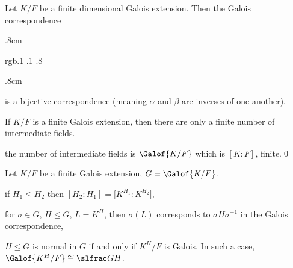 \bthrm[title=The Fundamental Theorem of Galois Theory, name=ftogt]

    Let $K/F$ be a finite dimensional Galois extension.
    Then the Galois correspondence

    \kern.8cm
    \centerline{\color rgb{.1 .1 .8}}
    \kern.8cm

    is a bijective correspondence (meaning $\alpha$ and $\beta$ are inverses of one another).

\ethrm

\bcoro

    If $K/F$ is a finite Galois extension, then there are only a finite number of intermediate fields.

\ecoro

\Proof the number of intermediate fields is $\Galof{K/F}$ which is $[K:F]$, finite.\qed

\bcoro[name=galoisproperties]

    Let $K/F$ be a finite Galois extension, $G=\Galof{K/F}$.
    \benum
        \item if $H_1\leq H_2$ then $[H_2:H_1]=\bigl[K^{H_1}:K^{H_2}\bigr]$,
        \item for $\sigma\in G$, $H\leq G$, $L=K^H$, then $\sigma(L)$ corresponds to $\sigma H\sigma^{-1}$ in the Galois correspondence,
        \item $H\leq G$ is normal in $G$ if and only if $K^H/F$ is Galois.
        In such a case, $\Galof{K^H/F}\cong\slfrac GH$.
    \eenum

\ecoro


